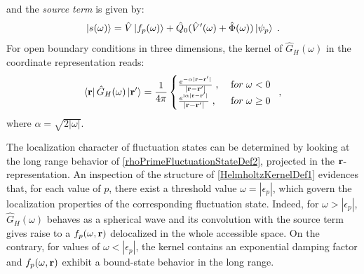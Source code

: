 \documentclass[reprint,aps,prb]{revtex4-1}
\renewcommand{\r}{{\bf r}}
\newcommand{\eps}{\epsilon}
\newcommand{\ii}{\mathrm{i}}
\newcommand{\be}{\begin{equation}}
\newcommand{\ee}{\end{equation}}
\newcommand{\nn}{\notag}
\newcommand{\lb}{\label}
\newcommand{\op}[1]{\hat {#1}}
\begin{document}
and the \emph{source term} is given by:
\be
\ket{s(\omega)} =  \op V\ket{f_p(\omega)} + \op Q_0(\op V'(\omega) + \op \Phi(\omega))\ket{\psi_p} \;.\nn
\ee
For open boundary conditions in three dimensions, the kernel of $\op G_H(\omega)$ in the coordinate representation reads: 
\be\lb{HelmholtzKernelDef1}
\bra{\r} \op G_H(\omega) \ket{\r'} = \frac{1}{4\pi} \begin{cases}
\frac{e^{-\alpha|\r - \r' |}}{|\r- \r' |} \;,\; & {\textrm for}\; \omega  < 0\; \\ 
\frac{e^{\ii \alpha |\r-\r' |}}{|\r-\r' |} \;, & {\textrm for} \; \omega \geq 0
\end{cases} \;,
\ee
where $\alpha = \sqrt{2|\omega|}$. 

The localization character of fluctuation states can be determined by looking at the long range behavior of \eqref{rhoPrimeFluctuationStateDef2}, projected in the $\r$-representation.
An inspection of the structure of \eqref{HelmholtzKernelDef1} evidences that, for each value of $p$, there exist a threshold value $\omega = |\eps_p|$, which govern the localization 
properties of the corresponding fluctuation state. Indeed, for $\omega > |\eps_p|$,  $\op G_H(\omega)$ behaves as a spherical wave and its convolution with the source term  gives 
raise to a $f_p(\omega,\r)$ delocalized in the whole accessible space. On the contrary, for values of $\omega < |\eps_p|$, %
the kernel contains an exponential damping factor and $f_p(\omega,\r)$ exhibit a bound-state behavior in the long range.   

\end{document}
